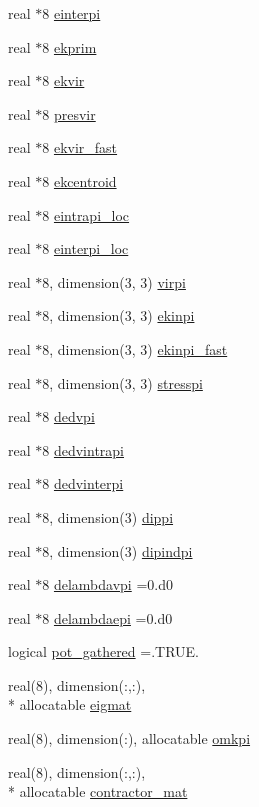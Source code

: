 \begin{DoxyCompactItemize}
\item 
real $\ast$8 \hyperlink{classbeads_ab3aabcdb848dcaeabe218d7d520ee2b1}{einterpi}
\item 
real $\ast$8 \hyperlink{classbeads_ae8d29aeba531bd7ef1c9f36bd8974c6d}{ekprim}
\item 
real $\ast$8 \hyperlink{classbeads_a64469ad6a8fb631a971525a333d77020}{ekvir}
\item 
real $\ast$8 \hyperlink{classbeads_a8eadc4b834c6fa3a55d3e6d8f7338165}{presvir}
\item 
real $\ast$8 \hyperlink{classbeads_aff38b015c1cc6a0ff0bf455ebcdcc7f7}{ekvir\-\_\-fast}
\item 
real $\ast$8 \hyperlink{classbeads_a4d358a2a18572045af499cebdfc02f1d}{ekcentroid}
\item 
real $\ast$8 \hyperlink{classbeads_a26edcda9f89396d8942be0ffed0a15ab}{eintrapi\-\_\-loc}
\item 
real $\ast$8 \hyperlink{classbeads_a8c633b8679d1f8d066adcd2261e62e4a}{einterpi\-\_\-loc}
\item 
real $\ast$8, dimension(3, 3) \hyperlink{classbeads_a2e963637c44512cc2e0401584593c071}{virpi}
\item 
real $\ast$8, dimension(3, 3) \hyperlink{classbeads_a4ef4d946c3f5e1797f46087f8bb6a1b0}{ekinpi}
\item 
real $\ast$8, dimension(3, 3) \hyperlink{classbeads_ae29240de23b637b74b7a3ebb4beed1ef}{ekinpi\-\_\-fast}
\item 
real $\ast$8, dimension(3, 3) \hyperlink{classbeads_a03a9eebd00567c9725d71b8ad2b4d379}{stresspi}
\item 
real $\ast$8 \hyperlink{classbeads_a9af03c4ca66930f0df7a0a7724b74be4}{dedvpi}
\item 
real $\ast$8 \hyperlink{classbeads_ac0412d751986be2a18361d16c4f3b632}{dedvintrapi}
\item 
real $\ast$8 \hyperlink{classbeads_a407bf78d2a253686a7e1b6f37f559107}{dedvinterpi}
\item 
real $\ast$8, dimension(3) \hyperlink{classbeads_a8724cd55cbbb19fd54e4794fc1d99690}{dippi}
\item 
real $\ast$8, dimension(3) \hyperlink{classbeads_a4766861f20d2423d705ad485ab88d60a}{dipindpi}
\item 
real $\ast$8 \hyperlink{classbeads_ac3035b58557831f8b99b5790841f66ba}{delambdavpi} =0.d0
\item 
real $\ast$8 \hyperlink{classbeads_a5c71ffc8c3220de7714385d1e40b5842}{delambdaepi} =0.d0
\item 
logical \hyperlink{classbeads_aab5d9071ceb4efc44ff75a705a3e0ec5}{pot\-\_\-gathered} =.T\-R\-U\-E.
\item 
real(8), dimension(\-:,\-:), \\*
allocatable \hyperlink{classbeads_a1a1ae0b7a858c5d1568204d3c7db7980}{eigmat}
\item 
real(8), dimension(\-:), allocatable \hyperlink{classbeads_a6b2283331985cfc64992d31d7ede9b4d}{omkpi}
\item 
real(8), dimension(\-:,\-:), \\*
allocatable \hyperlink{classbeads_a9020a7560a1b66c7a74572df622d7f3e}{contractor\-\_\-mat}
\end{DoxyCompactItemize}


